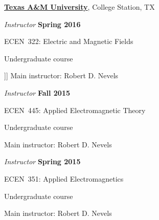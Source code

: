 \documentclass[10pt]{article}
\newcommand{\halfblankline}{\quad\vspace{-0.5\baselineskip}\pagebreak[3]}
\begin{document}
\href{http://www.tamu.edu/}{\textbf{Texas A\&M University}},
College Station, TX
\begin{outerlist}
\item[] \textit{Instructor} \hfill \textbf{Spring 2016}
    \begin{innerlist}
        \item ECEN~322: Electric and Magnetic Fields
        \begin{innerlist}
            \item[] Undergraduate course
            \item]] Main instructor: Robert D. Nevels
        \end{innerlist}
    \end{innerlist}

\item[] \textit{Instructor} \hfill \textbf{Fall 2015}
    \begin{innerlist}
        \item ECEN~445: Applied Electromagnetic Theory
        \begin{innerlist}
            \item[] Undergraduate course
            \item[] Main instructor: Robert D. Nevels
        \end{innerlist}
    \end{innerlist}

\item[] \textit{Instructor} \hfill \textbf{Spring 2015}
    \begin{innerlist}
        \item ECEN~351: Applied Electromagnetics
        \begin{innerlist}
            \item[] Undergraduate course
            \item[] Main instructor: Robert D. Nevels
        \end{innerlist}
    \end{innerlist}

\end{outerlist}

\halfblankline
\end{document}
